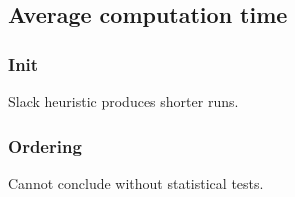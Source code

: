 \subsection{Average computation time}


\subsubsection{Init}

Slack heuristic produces shorter runs.

\subsubsection{Ordering}

Cannot conclude without statistical tests.



